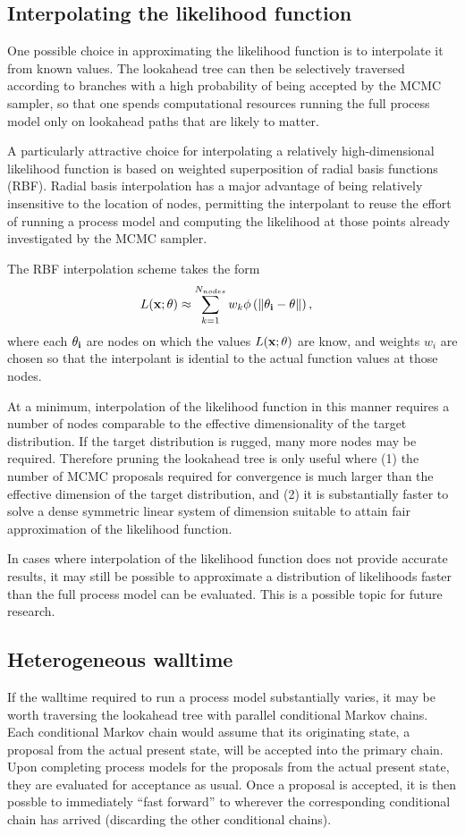 \documentclass[10pt]{article}
\begin{document}
\subsection{Interpolating the likelihood function}
One possible choice in approximating the likelihood function is to interpolate it from known values.
The lookahead tree can then be selectively traversed according to branches with a high probability of being accepted by the MCMC sampler, so that one spends computational resources running the full process model only on lookahead paths that are likely to matter.

A particularly attractive choice for interpolating a relatively high-dimensional likelihood function is based on weighted superposition of radial basis functions (RBF).
Radial basis interpolation has a major advantage of being relatively insensitive to the location of nodes,
permitting the interpolant to reuse the effort of running a process model and computing the likelihood at those points already investigated by the MCMC sampler.

The RBF interpolation scheme takes the form
\begin{align*}
    L(\bf{x}; \bf{\theta}) &\approx \sum_{k=1}^{N_{nodes}} w_{k} \phi \left( \| \bf{\theta_i} - \bf{\theta} \| \right),
\end{align*}
where each $\bf{\theta_i}$ are nodes on which the values $L(\bf{x}; \bf{\theta})$ are know, and weights $w_i$ are chosen so that the interpolant is idential to the actual function values at those nodes.

At a minimum, interpolation of the likelihood function in this manner requires a number of nodes comparable to the effective dimensionality of the target distribution.
If the target distribution is rugged, many more nodes may be required.
Therefore pruning the lookahead tree is only useful where (1) the number of MCMC proposals required for convergence is much larger than the effective dimension of the target distribution, and (2) it is substantially faster to solve a dense symmetric linear system of dimension suitable to attain fair approximation of the likelihood function.

In cases where interpolation of the likelihood function does not provide accurate results, it may still be possible to approximate a distribution of likelihoods faster than the full process model can be evaluated.
This is a possible topic for future research.

\subsection{Heterogeneous walltime}
If the walltime required to run a process model substantially varies, it may be worth traversing the lookahead tree with parallel conditional Markov chains.
Each conditional Markov chain would assume that its originating state, a proposal from the actual present state, will be accepted into the primary chain.
Upon completing process models for the proposals from the actual present state, they are evaluated for acceptance as usual.
Once a proposal is accepted, it is then possble to immediately ``fast forward'' to wherever the corresponding conditional chain has arrived (discarding the other conditional chains).
\end{document}
